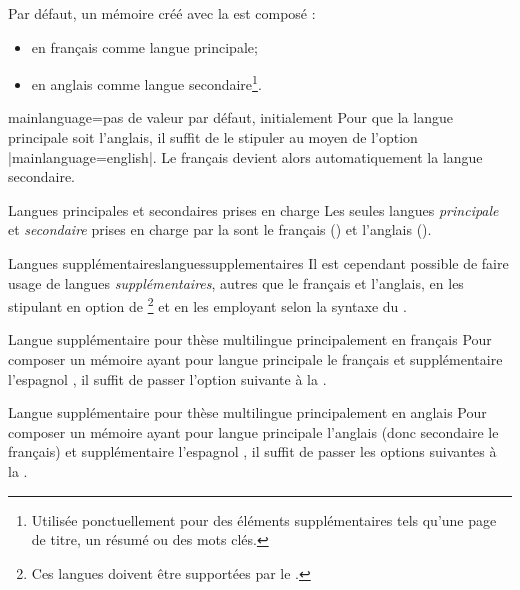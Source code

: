 Par défaut, un mémoire créé avec la \yatCl{} est composé :
\begin{itemize}
\item en français comme langue principale;
\item en anglais comme langue secondaire\footnote{Utilisée ponctuellement pour
    des éléments supplémentaires tels qu'une page de titre, un résumé ou des
    mots clés.}.
\end{itemize}
%
\begin{docKey}{mainlanguage}{=\textbar{}}{pas
    de valeur par défaut, initialement }
  Pour que la langue principale  soit l'anglais, il
  suffit de le stipuler au moyen de l'option |mainlanguage=english|. Le français
  devient alors automatiquement la langue secondaire.
\end{docKey}

\begin{dbwarning}{Langues principales et secondaires prises en charge}{}
  Les seules langues \emph{principale} et \emph{secondaire} prises en charge
  par la \yatCl{} sont le français () et l'anglais
  ().
\end{dbwarning}

\begin{dbremark}{Langues supplémentaires}{languessupplementaires}
  Il est cependant possible de faire usage de langues \emph{supplémentaires},
  autres que le français et l'anglais, en les stipulant en option de
  \footnote{Ces langues doivent être supportées par
    le .} et en les employant selon la syntaxe du
  .
\end{dbremark}

\begin{dbexample}{Langue supplémentaire pour thèse
    multilingue principalement en français}{}
  Pour composer un mémoire ayant pour langue principale le français et
  supplémentaire l'espagnol , il suffit de passer l'option suivante à la \yatCl{}.
\end{dbexample}

\begin{dbexample}{Langue supplémentaire pour thèse
    multilingue principalement en anglais}{}
  Pour composer un mémoire ayant pour langue principale l'anglais (donc
  secondaire le français) et supplémentaire l'espagnol , il suffit de passer les options
  suivantes à la \yatCl{}.
\end{dbexample}

